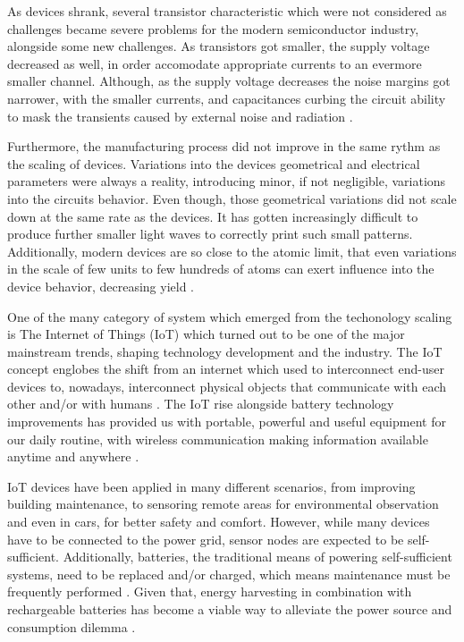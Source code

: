 \documentclass[pgmicro,mestrado,english]{iiufrgs}
\begin{document}
	As devices shrank, several transistor characteristic which were not considered as challenges became severe problems for the modern semiconductor industry, alongside some new challenges. As transistors got smaller, the supply voltage decreased as well, in order accomodate appropriate currents to an evermore smaller channel. Although, as the supply voltage decreases the noise margins got narrower, with the smaller currents, and capacitances curbing the circuit ability to mask the transients caused by external noise and radiation \cite{abbas:15}.

	Furthermore, the manufacturing process did not improve in the same rythm as the scaling of devices. Variations into the devices geometrical and electrical parameters were always a reality, introducing minor, if not negligible, variations into the circuits behavior. Even though, those geometrical variations did not scale down at the same rate as the devices. It has gotten increasingly difficult to produce further smaller light waves to correctly print such small patterns. Additionally, modern devices are so close to the atomic limit, that even variations in the scale of few units to few hundreds of atoms can exert influence into the device behavior, decreasing yield \cite{abbas:15}.

    One of the many category of system which emerged from the techonology scaling is The Internet of Things (IoT) which turned out to be one of the major mainstream trends, shaping technology development and the industry. The IoT concept englobes the shift from an internet which used to interconnect end-user devices to, nowadays, interconnect physical objects that communicate with each other and/or with humans \cite{miorandi2012internet}. The IoT rise alongside battery technology improvements has provided us with portable, powerful and useful equipment for our daily routine, with wireless communication making information available anytime and anywhere \cite{manoli2010energy}.

    IoT devices have been applied in many different scenarios, from improving building maintenance, to sensoring remote areas for environmental observation and even in cars, for better safety and comfort. However, while many devices have to be connected to the power grid, sensor nodes are expected to be self-sufficient. Additionally, batteries, the traditional means of powering self-sufficient systems, need to be replaced and/or charged, which means maintenance must be frequently performed \cite{bleitner2018comparison}. Given that, energy harvesting in combination with rechargeable batteries has become a viable way to alleviate the power source and consumption dilemma \cite{manoli2010energy}.
\end{document}
